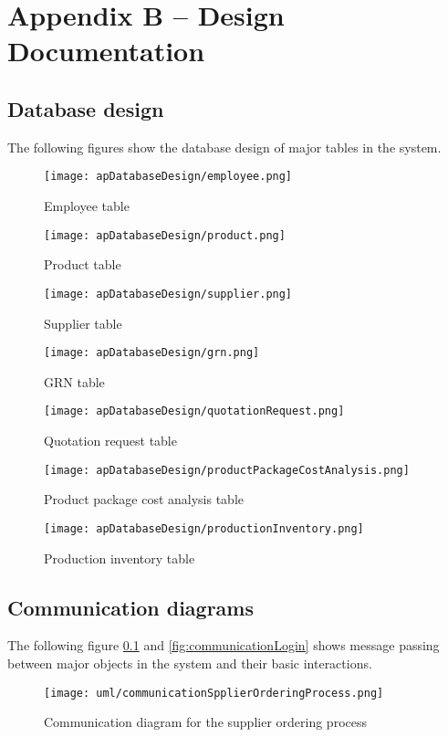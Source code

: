 \documentclass[12pt]{report}
\begin{document}
\chapter*{\Huge Appendix B – Design Documentation}

\section{Database design}
The following figures show the database design of major tables in the system.

\begin{figure}[H]
	\centering
	\texttt{[image: apDatabaseDesign/employee.png]}
	\caption{Employee table}
\end{figure}

\begin{figure}[H]
	\centering
	\texttt{[image: apDatabaseDesign/product.png]}
	\caption{Product table}
\end{figure}

\begin{figure}[H]
	\centering
	\texttt{[image: apDatabaseDesign/supplier.png]}
	\caption{Supplier table}
\end{figure}

\begin{figure}[H]
	\centering
	\texttt{[image: apDatabaseDesign/grn.png]}
	\caption{GRN table}
\end{figure}

\begin{figure}[H]
	\centering
	\texttt{[image: apDatabaseDesign/quotationRequest.png]}
	\caption{Quotation request table}
\end{figure}

\begin{figure}[H]
	\centering
	\texttt{[image: apDatabaseDesign/productPackageCostAnalysis.png]}
	\caption{Product package cost analysis table}
\end{figure}

\begin{figure}[H]
	\centering
	\texttt{[image: apDatabaseDesign/productionInventory.png]}
	\caption{Production inventory table}
\end{figure}

\newpage
\section{Communication diagrams}
The following figure \ref{fig:communicationSpplierOrderingProcess} and \ref{fig:communicationLogin} shows message passing between major objects in the system and their basic interactions.
\begin{figure}[H]
	\centering
	\texttt{[image: uml/communicationSpplierOrderingProcess.png]}
	\caption{Communication diagram for the supplier ordering process}
	\label{fig:communicationSpplierOrderingProcess}
\end{figure}
\end{document}
